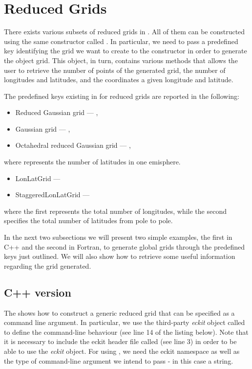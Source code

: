\section{Reduced Grids}
There exists various subsets of reduced grids in \Atlas.
All of them can be constructed using the same constructor
called . In particular, we need to pass 
a predefined key identifying the grid we want to create 
to the constructor in order to generate the object grid. 
This object, in turn, contains various methods that allows 
the user to retrieve the number of points of the generated 
grid, the number of longitudes and latitudes, and the 
coordinates a given longitude and latitude.

The predefined keys existing in \Atlas for reduced grids 
are reported in the following:
%
\begin{itemize}
\item Reduced Gaussian grid --- ,
\item Gaussian grid --- ,
\item Octahedral reduced Gaussian grid --- ,
\end{itemize}
%
where \inltc{\#} represents the number of latitudes 
in one emisphere.
%
\begin{itemize}
\item LonLatGrid --- 
\item StaggeredLonLatGrid --- 
\end{itemize}
%
where the first \inltc{\#} represents the total number 
of longitudes, while the second specifies the total number 
of latitudes from pole to pole.

In the next two subsections we will present two simple 
examples, the first in C++ and the second in Fortran, 
to generate global grids through the predefined keys 
just outlined. We will also show how to retrieve some 
useful information regarding the grid generated.

\subsection{C++ version}
The  shows how to construct a generic 
reduced grid that can be specified as a command line 
argument. In particular, we use the third-party \textit{eckit} 
object called  to define the command-line 
behaviour (see line 14 of the listing below). Note that 
it is necessary to include the eckit header file called 
 (see line 3) in order to be able to 
use the \textit{eckit}  object. 
For using , we need the eckit namespace 
 as well as the type of command-line 
argument we intend to pass - in this case a string.

